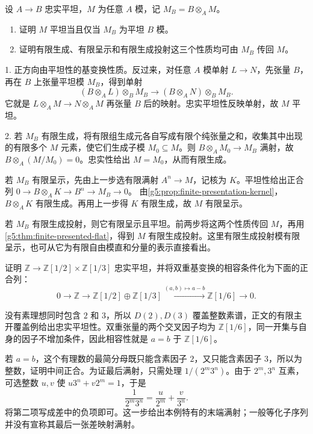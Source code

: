 \begin{exercise}\label{g5:ex:faithful-descent-properties}
	设 \(A\to B\) 忠实平坦，\(M\) 为任意 \(A\) 模，记 \(M_B=B\otimes_A M\)。
	\begin{enumerate}
		\item 证明 \(M\) 平坦当且仅当 \(M_B\) 为平坦 \(B\) 模。
		\item 证明有限生成、有限呈示和有限生成投射这三个性质均可由 \(M_B\) 传回 \(M\)。
	\end{enumerate}
\end{exercise}
\begin{solution}
	1. 正方向由平坦性的基变换性质。反过来，对任意 \(A\) 模单射 \(L\to N\)，先张量 \(B\)，再在 \(B\) 上张量平坦模 \(M_B\)，得到单射
	\[
		(B\otimes_A L)\otimes_B M_B
		\longrightarrow(B\otimes_A N)\otimes_B M_B.
	\]
	它就是 \(L\otimes_A M\to N\otimes_A M\) 再张量 \(B\) 后的映射。忠实平坦性反映单射，故 \(M\) 平坦。

	2. 若 \(M_B\) 有限生成，将有限组生成元各自写成有限个纯张量之和，收集其中出现的有限多个 \(M\) 元素，使它们生成子模 \(M_0\subseteq M\)。则 \(B\otimes_A M_0\to M_B\) 满射，故 \(B\otimes_A(M/M_0)=0\)。忠实性给出 \(M=M_0\)，从而有限生成。

	若 \(M_B\) 有限呈示，先由上一步选有限满射 \(A^n\to M\)，记核为 \(K\)。平坦性给出正合列
	\(0\to B\otimes_AK\to B^n\to M_B\to0\)。
	由\cref{g5:prop:finite-presentation-kernel}，\(B\otimes_A K\) 有限生成。再用上一步得 \(K\) 有限生成，故 \(M\) 有限呈示。

	若 \(M_B\) 有限生成投射，则它有限呈示且平坦。前两步将这两个性质传回 \(M\)，再用\cref{g5:thm:finite-presented-flat}，得到 \(M\) 有限生成投射。这里有限生成投射模有限呈示，也可从它为有限自由模直和分量的表示直接看出。
\end{solution}

\begin{exercise}\label{g5:ex:integers-principal-cover}
	证明 \(\mathbb Z\to\mathbb Z[1/2]\times\mathbb Z[1/3]\) 忠实平坦，并将双重基变换的相容条件化为下面的正合列：
	\[
		0\longrightarrow\mathbb Z
		\longrightarrow\mathbb Z[1/2]\oplus\mathbb Z[1/3]
		\xrightarrow{(a,b)\mapsto a-b}\mathbb Z[1/6]
		\longrightarrow0.
	\]
\end{exercise}
\begin{solution}
	没有素理想同时包含 \(2\) 和 \(3\)，所以 \(D(2),D(3)\) 覆盖整数素谱，正文的有限主开覆盖例给出忠实平坦性。双重张量的两个交叉因子均为 \(\mathbb Z[1/6]\)，同一开集与自身的因子不增加条件，因此相容性就是 \(a=b\) 于 \(\mathbb Z[1/6]\)。

	若 \(a=b\)，这个有理数的最简分母既只能含素因子 \(2\)，又只能含素因子 \(3\)，所以为整数，证明中间正合。为证最后满射，只需处理 \(1/(2^m3^n)\)。由于 \(2^m,3^n\) 互素，可选整数 \(u,v\) 使 \(u3^n+v2^m=1\)，于是
	\[
		\frac1{2^m3^n}=\frac{u}{2^m}+\frac{v}{3^n}.
	\]
	将第二项写成差中的负项即可。这一步给出本例特有的末端满射；一般等化子序列并没有宣称其最后一张差映射满射。
\end{solution}


